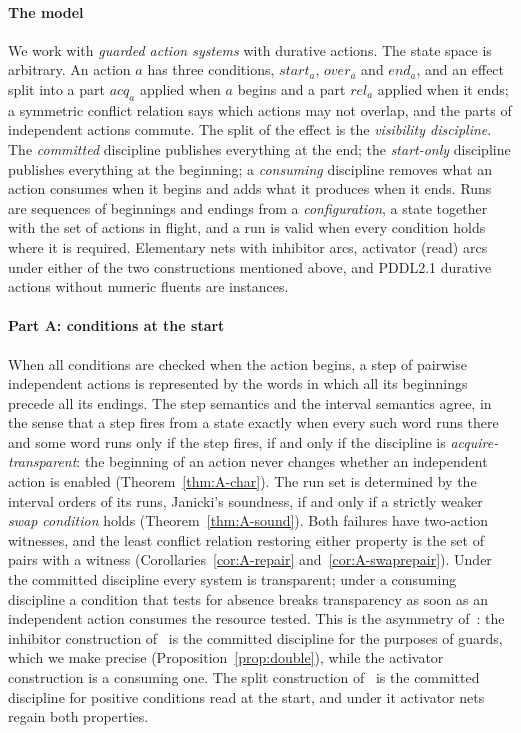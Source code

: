 \documentclass[preprint,12pt]{elsarticle}
\theoremstyle{plain}
\theoremstyle{definition}
\newcommand{\st}{\mathit{start}}
\newcommand{\ovr}{\mathit{over}}
\newcommand{\stp}{\mathit{end}}
\newcommand{\acq}{\mathit{acq}}
\newcommand{\rel}{\mathit{rel}}
\begin{document}
\paragraph{The model}
We work with \emph{guarded action systems} with durative actions. The state space is arbitrary. An action $a$ has three conditions, $\st_a$, $\ovr_a$ and $\stp_a$, and an effect split into a part $\acq_a$ applied when $a$ begins and a part $\rel_a$ applied when it ends; a symmetric conflict relation says which actions may not overlap, and the parts of independent actions commute. The split of the effect is the \emph{visibility discipline}. The \emph{committed} discipline publishes everything at the end; the \emph{start-only} discipline publishes everything at the beginning; a \emph{consuming} discipline removes what an action consumes when it begins and adds what it produces when it ends. Runs are sequences of beginnings and endings from a \emph{configuration}, a state together with the set of actions in flight, and a run is valid when every condition holds where it is required. Elementary nets with inhibitor arcs, activator (read) arcs under either of the two constructions mentioned above, and PDDL2.1 durative actions without numeric fluents are instances.

\paragraph{Part A: conditions at the start}
When all conditions are checked when the action begins, a step of pairwise independent actions is represented by the words in which all its beginnings precede all its endings. The step semantics and the interval semantics agree, in the sense that a step fires from a state exactly when every such word runs there and some word runs only if the step fires, if and only if the discipline is \emph{acquire-transparent}: the beginning of an action never changes whether an independent action is enabled (Theorem~\ref{thm:A-char}). The run set is determined by the interval orders of its runs, Janicki's soundness, if and only if a strictly weaker \emph{swap condition} holds (Theorem~\ref{thm:A-sound}). Both failures have two-action witnesses, and the least conflict relation restoring either property is the set of pairs with a witness (Corollaries~\ref{cor:A-repair} and~\ref{cor:A-swaprepair}). Under the committed discipline every system is transparent; under a consuming discipline a condition that tests for absence breaks transparency as soon as an independent action consumes the resource tested. This is the asymmetry of~\cite{Janicki2019}: the inhibitor construction of~\cite{AlqarniJanicki2015} is the committed discipline for the purposes of guards, which we make precise (Proposition~\ref{prop:double}), while the activator construction is a consuming one. The split construction of~\cite{ChatainHaarKoutnySchwoon2015} is the committed discipline for positive conditions read at the start, and under it activator nets regain both properties.
\end{document}
